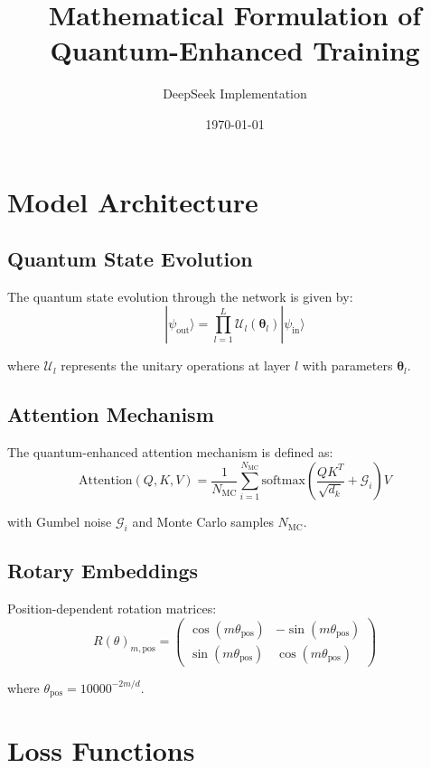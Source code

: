 \documentclass{article}
\title{Mathematical Formulation of Quantum-Enhanced Training}
\author{DeepSeek Implementation}
\date{\today}
\begin{document}
\maketitle

\section{Model Architecture}

\subsection{Quantum State Evolution}
The quantum state evolution through the network is given by:
\begin{equation}
|\psi_{\text{out}}\rangle = \prod_{l=1}^L \mathcal{U}_l(\bm{\theta}_l)|\psi_{\text{in}}\rangle
\end{equation}

where $\mathcal{U}_l$ represents the unitary operations at layer $l$ with parameters $\bm{\theta}_l$.

\subsection{Attention Mechanism}
The quantum-enhanced attention mechanism is defined as:
\begin{equation}
\text{Attention}(Q,K,V) = \frac{1}{N_{\text{MC}}}\sum_{i=1}^{N_{\text{MC}}} \text{softmax}\left(\frac{QK^T}{\sqrt{d_k}} + \mathcal{G}_i\right)V
\end{equation}

with Gumbel noise $\mathcal{G}_i$ and Monte Carlo samples $N_{\text{MC}}$.

\subsection{Rotary Embeddings}
Position-dependent rotation matrices:
\begin{equation}
R(\theta)_{m,\text{pos}} = \begin{pmatrix}
\cos(m\theta_{\text{pos}}) & -\sin(m\theta_{\text{pos}}) \\
\sin(m\theta_{\text{pos}}) & \cos(m\theta_{\text{pos}})
\end{pmatrix}
\end{equation}

where $\theta_{\text{pos}} = 10000^{-2m/d}$.

\section{Loss Functions}
\end{document}
